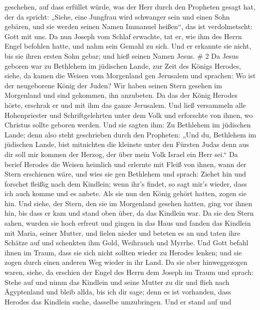 geschehen, auf dass erfüllet würde, was der Herr durch den Propheten
gesagt hat, der da spricht:  „Siehe, eine Jungfrau wird
schwanger sein und einen Sohn gebären, und sie werden seinen Namen
Immanuel heißen``, das ist verdolmetscht: Gott mit uns.  Da
nun Joseph vom Schlaf erwachte, tat er, wie ihm des Herrn Engel befohlen
hatte, und nahm sein Gemahl zu sich.  Und er erkannte sie
nicht, bis sie ihren ersten Sohn gebar; und hieß seinen Namen Jesus. \#
2  Da Jesus geboren war zu Bethlehem im jüdischen Lande, zur
Zeit des Königs Herodes, siehe, da kamen die Weisen vom Morgenland gen
Jerusalem und sprachen:  Wo ist der neugeborene König der
Juden? Wir haben seinen Stern gesehen im Morgenland und sind gekommen,
ihn anzubeten.  Da das der König Herodes hörte, erschrak er
und mit ihm das ganze Jerusalem.  Und ließ versammeln alle
Hohenpriester und Schriftgelehrten unter dem Volk und erforschte von
ihnen, wo Christus sollte geboren werden.  Und sie sagten
ihm: Zu Bethlehem im jüdischen Lande; denn also steht geschrieben durch
den Propheten:  „Und du, Bethlehem im jüdischen Lande, bist
mitnichten die kleinste unter den Fürsten Judas denn aus dir soll mir
kommen der Herzog, der über mein Volk Israel ein Herr sei.``
 Da berief Herodes die Weisen heimlich und erlernte mit
Fleiß von ihnen, wann der Stern erschienen wäre,  und wies
sie gen Bethlehem und sprach: Ziehet hin und forschet fleißig nach dem
Kindlein; wenn ihr's findet, so sagt mir's wieder, dass ich auch komme
und es anbete.  Als sie nun den König gehört hatten, zogen
sie hin. Und siehe, der Stern, den sie im Morgenland gesehen hatten,
ging vor ihnen hin, bis dass er kam und stand oben über, da das Kindlein
war.  Da sie den Stern sahen, wurden sie hoch erfreut
 und gingen in das Haus und fanden das Kindlein mit Maria,
seiner Mutter, und fielen nieder und beteten es an und taten ihre
Schätze auf und schenkten ihm Gold, Weihrauch und Myrrhe. 
Und Gott befahl ihnen im Traum, dass sie sich nicht sollten wieder zu
Herodes lenken; und sie zogen durch einen anderen Weg wieder in ihr
Land.  Da sie aber hinweggezogen waren, siehe, da erschien
der Engel des Herrn dem Joseph im Traum und sprach: Stehe auf und nimm
das Kindlein und seine Mutter zu dir und flieh nach Ägyptenland und
bleib allda, bis ich dir sage; denn es ist vorhanden, dass Herodes das
Kindlein suche, dasselbe umzubringen.  Und er stand auf und
